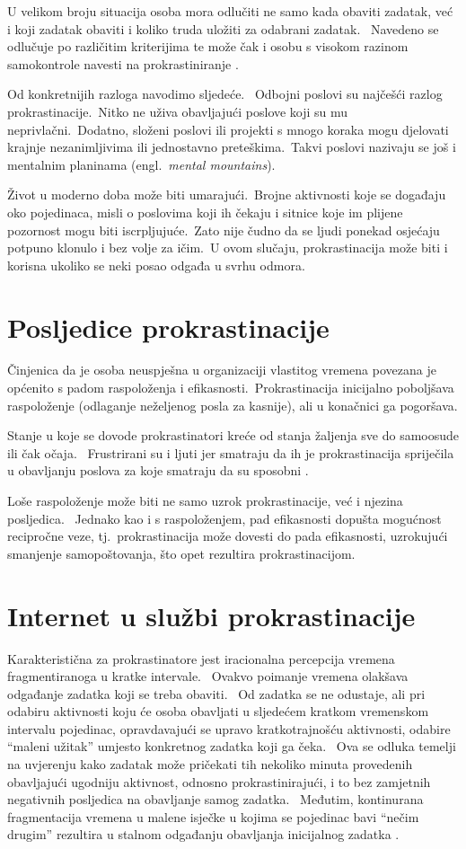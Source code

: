 \documentclass[11pt,twocolumn,english]{article}
\newcommand{\engl}[1]{(engl.~\emph{#1})}
\begin{document}
U velikom broju situacija osoba mora odlučiti ne samo kada obaviti zadatak, već
i koji zadatak obaviti i koliko truda uložiti za odabrani zadatak.~
Navedeno se odlučuje po različitim kriterijima te može čak i osobu s visokom
razinom samokontrole navesti na prokrastiniranje \cite{o2001choice}.

Od konkretnijih razloga \cite{PickBrain5reasons, Lifehack6reasons} navodimo
sljedeće.~ Odbojni poslovi su najčešći razlog prokrastinacije.~Nitko ne uživa
obavljajući poslove koji su mu neprivlačni.~Dodatno, složeni poslovi ili
projekti s mnogo koraka mogu djelovati krajnje nezanimljivima ili jednostavno
preteškima.~Takvi poslovi nazivaju se još i mentalnim planinama \engl{mental
mountains}.

Život u moderno doba može biti umarajući.~Brojne aktivnosti koje se
događaju oko pojedinaca, misli o poslovima koji ih čekaju i sitnice koje im
plijene pozornost mogu biti iscrpljujuće.~Zato nije čudno da se ljudi ponekad
osjećaju potpuno klonulo i bez volje za ičim.~U ovom slučaju,
prokrastinacija može biti i korisna ukoliko se neki posao odgađa u svrhu odmora.


\section{Posljedice prokrastinacije}
Činjenica da je osoba neuspješna u organizaciji vlastitog vremena povezana je
općenito s padom raspoloženja i efikasnosti.~Prokrastinacija inicijalno
poboljšava raspoloženje (odlaganje neželjenog posla za kasnije), ali u
konačnici ga pogoršava.

Stanje u koje se dovode prokrastinatori kreće od
stanja žaljenja sve do samoosude ili čak očaja.~ Frustrirani su i ljuti jer
smatraju da ih je prokrastinacija spriječila u obavljanju poslova za koje
smatraju da su sposobni \cite{burka2004procrastination}.

Loše raspoloženje može biti ne samo uzrok prokrastinacije,
već i njezina posljedica.~ Jednako kao i s raspoloženjem, pad efikasnosti
dopušta mogućnost recipročne veze, tj.~prokrastinacija može dovesti do pada
efikasnosti, uzrokujući smanjenje samopoštovanja, što opet rezultira prokrastinacijom.


\section{Internet u službi prokrastinacije}
Karakteristična za prokrastinatore jest iracionalna percepcija vremena fragmentiranoga u kratke
intervale.~ Ovakvo poimanje vremena olakšava odgađanje zadatka koji se treba obaviti.~ Od zadatka se
ne odustaje, ali pri odabiru aktivnosti koju će osoba obavljati u sljedećem kratkom
vremenskom intervalu pojedinac, opravdavajući se upravo kratkotrajnošću aktivnosti, odabire ``maleni užitak''
umjesto konkretnog zadatka koji ga čeka.~ Ova se odluka temelji na uvjerenju kako zadatak može pričekati
tih nekoliko minuta provedenih obavljajući ugodniju aktivnost, odnosno prokrastinirajući, i to bez
zamjetnih negativnih posljedica na obavljanje samog zadatka.~ Međutim, kontinurana fragmentacija vremena
u malene isječke u kojima se pojedinac bavi ``nečim drugim'' rezultira u stalnom odgađanju obavljanja
inicijalnog zadatka \cite{Online08thatchera}.
\end{document}
